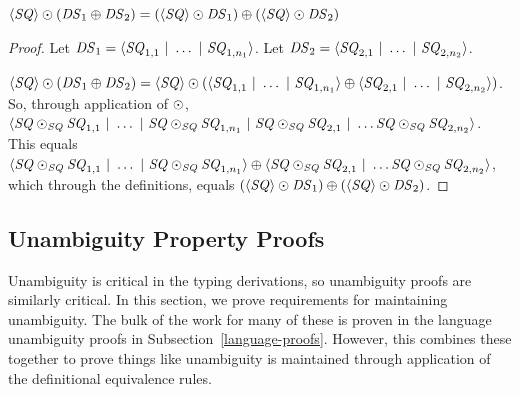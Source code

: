 \documentclass[acmsmall]{acmart}
\begin{document}
\begin{lemma}
  \label{lem:dnf-distribute-singleton-left}
  $\langle\mathit{SQ}\rangle \odot (\mathit{DS}_1 \oplus \mathit{DS}_2) =
  (\langle\mathit{SQ}\rangle \odot \mathit{DS}_1) \oplus
  (\langle\mathit{SQ}\rangle \odot \mathit{DS}_2)$
\end{lemma}
\begin{proof}
  Let $\mathit{DS}_1 = \langle\mathit{SQ}_{1,1} ~|~ \ldots ~|~ \mathit{SQ}_{1,n_1}\rangle$.
  Let $\mathit{DS}_2 = \langle\mathit{SQ}_{2,1} ~|~ \ldots ~|~ \mathit{SQ}_{2,n_2}\rangle$.

  $\langle\mathit{SQ}\rangle \odot (\mathit{DS}_1 \oplus \mathit{DS}_2) =
  \langle\mathit{SQ}\rangle \odot
  (\langle\mathit{SQ}_{1,1} ~|~ \ldots ~|~ \mathit{SQ}_{1,n_1}\rangle \oplus
  \langle\mathit{SQ}_{2,1} ~|~ \ldots ~|~ \mathit{SQ}_{2,n_2}\rangle)$.
  So, through application of $\odot$,
  $\langle\mathit{SQ}\odot_{\mathit{SQ}}\mathit{SQ}_{1,1} ~|~ \ldots ~|~ 
    \mathit{SQ}\odot_{\mathit{SQ}}\mathit{SQ}_{1,n_1} ~|~ 
    \mathit{SQ}\odot_{\mathit{SQ}}\mathit{SQ}_{2,1} ~|~ \ldots
    \mathit{SQ}\odot_{\mathit{SQ}}\mathit{SQ}_{2,n_2}\rangle$.
  This equals
  $\langle\mathit{SQ}\odot_{\mathit{SQ}}\mathit{SQ}_{1,1} ~|~ \ldots ~|~ 
    \mathit{SQ}\odot_{\mathit{SQ}}\mathit{SQ}_{1,n_1}\rangle \oplus
  \langle\mathit{SQ}\odot_{\mathit{SQ}}\mathit{SQ}_{2,1} ~|~ \ldots
    \mathit{SQ}\odot_{\mathit{SQ}}\mathit{SQ}_{2,n_2}\rangle$, which through the definitions,
  equals
  $(\langle\mathit{SQ}\rangle \odot \mathit{DS}_1) \oplus
  (\langle\mathit{SQ}\rangle \odot \mathit{DS}_2)$.
\end{proof}

\subsection{Unambiguity Property Proofs}
\label{language-rewriting-unambiguity}

Unambiguity is critical in the typing derivations, so unambiguity proofs are
similarly critical.  In this section, we prove requirements for maintaining
unambiguity.  The bulk of the work for many of these is proven in the language
unambiguity proofs in Subsection~\ref{language-proofs}.  However, this combines
these together to prove things like unambiguity is maintained through
application of the
definitional equivalence rules.
\end{document}
